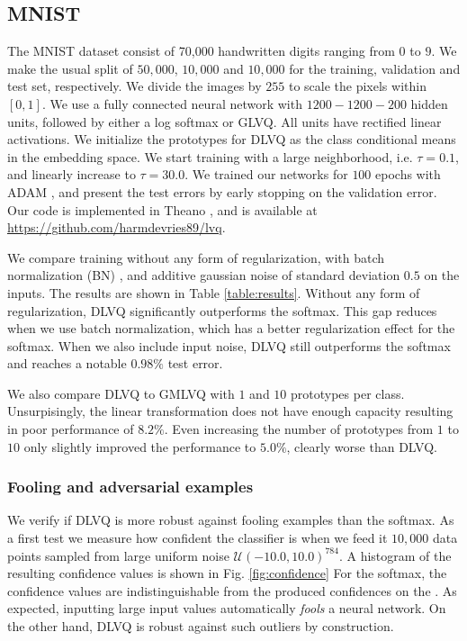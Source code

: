 \documentclass{esannV2}
\begin{document}
\subsection{MNIST}
The MNIST dataset consist of 70,000 handwritten digits ranging from $0$ to $9$. We make the usual split of $50,000$, $10,000$ and $10,000$ for the training, validation and test set, respectively. We divide the images by $255$ to scale the pixels within $[0, 1]$.  We use a fully connected neural network with $1200-1200-200$ hidden units, followed by either a log softmax or GLVQ. All units have rectified linear activations. We initialize the prototypes for DLVQ as the class conditional means in the embedding space. We start training with a large neighborhood, i.e. $\tau=0.1$, and linearly increase to $\tau=30.0$. 
We trained our networks for $100$ epochs with ADAM \cite{DBLP:journals/corr/KingmaB14}, and present the test errors by early stopping on the validation error.  
Our code is implemented in Theano \cite{Bastien-Theano-2012}, and is available at \url{https://github.com/harmdevries89/lvq}. 


We compare training without any form of regularization, with batch normalization (BN) \cite{DBLP:journals/corr/IoffeS15}, and additive gaussian noise of standard deviation $0.5$ on the inputs. The results are shown in Table \ref{table:results}. Without any form of regularization, DLVQ significantly outperforms the softmax. This gap reduces when we use batch normalization, which has a better regularization effect for the softmax. When we also include input noise, DLVQ still outperforms the softmax and reaches a notable $0.98\%$ test error. 

We also compare DLVQ to GMLVQ with $1$ and $10$ prototypes per class. Unsurpisingly, the linear transformation does not have enough capacity resulting in poor performance of $8.2\%$. Even increasing the number of prototypes from $1$ to $10$ only slightly improved the performance to $5.0\%$, clearly worse than DLVQ. 

\subsubsection{Fooling and adversarial examples}
We verify if DLVQ is more robust against fooling examples than the softmax. As a first test we measure how confident the classifier is when we feed it $10,000$ data points sampled from large uniform noise $\mathcal{U}(-10.0, 10.0)^{784}$. A histogram of the resulting confidence values is shown in Fig. \ref{fig:confidence} For the softmax, the confidence values are indistinguishable from the produced confidences on the . As expected,  inputting large input values automatically \emph{fools} a neural network. On the other hand, DLVQ is robust against such outliers by construction.
\end{document}
